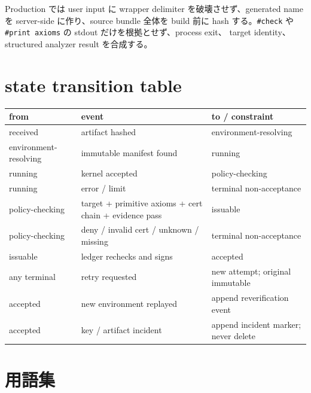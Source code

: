 \documentclass[a4paper,11pt]{ltjsarticle}
\newcommand{\code}[1]{\texttt{#1}}
\begin{document}
Production では user input に wrapper delimiter を破壊させず、generated name を server-side に作り、source bundle
全体を build 前に hash する。\code{\#check} や \code{\#print axioms} の stdout だけを根拠とせず、process exit、
target identity、structured analyzer result を合成する。

\section{state transition table}

\begin{tabularx}{\linewidth}{L{34mm}L{35mm}Y}
\toprule
\textbf{from} & \textbf{event} & \textbf{to / constraint} \\
\midrule
received & artifact hashed & environment-resolving \\
environment-resolving & immutable manifest found & running \\
running & kernel accepted & policy-checking \\
running & error / limit & terminal non-acceptance \\
policy-checking & target + primitive axioms + cert chain + evidence pass & issuable \\
policy-checking & deny / invalid cert / unknown / missing & terminal non-acceptance \\
issuable & ledger rechecks and signs & accepted \\
any terminal & retry requested & new attempt; original immutable \\
accepted & new environment replayed & append reverification event \\
accepted & key / artifact incident & append incident marker; never delete \\
\bottomrule
\end{tabularx}

\section{用語集}
\end{document}

